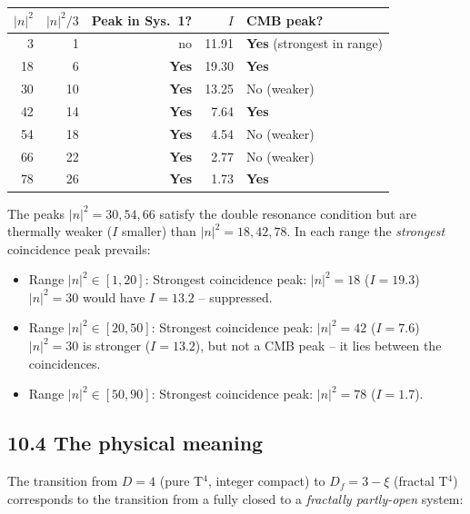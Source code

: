 \begin{center}
\begin{tabular}{rrrrl}
\toprule
$|n|^2$ & $|n|^2/3$ & Peak in Sys.~1? & $I$ & CMB peak? \\
\midrule
3  & 1  & no & 11{.}91 & \textbf{Yes} (strongest in range) \\
18 & 6  & \textbf{Yes} & 19{.}30 & \textbf{Yes} \\
30 & 10 & \textbf{Yes} & 13{.}25 & No (weaker) \\
42 & 14 & \textbf{Yes} & 7{.}64  & \textbf{Yes} \\
54 & 18 & \textbf{Yes} & 4{.}54  & No (weaker) \\
66 & 22 & \textbf{Yes} & 2{.}77  & No (weaker) \\
78 & 26 & \textbf{Yes} & 1{.}73  & \textbf{Yes} \\
\bottomrule
\end{tabular}
\end{center}

The peaks $|n|^2 = 30, 54, 66$ satisfy the double resonance condition
but are thermally weaker ($I$ smaller) than $|n|^2 = 18, 42, 78$.
In each range the \emph{strongest} coincidence peak prevails:

\begin{itemize}
  \item Range $|n|^2 \in [1, 20]$:\quad
        Strongest coincidence peak: $|n|^2 = 18$ ($I = 19{.}3$) \\
        \hphantom{Range $|n|^2 \in [1, 20]$:\quad}
        $|n|^2 = 30$ would have $I = 13{.}2$ -- suppressed.
  \item Range $|n|^2 \in [20, 50]$:\quad
        Strongest coincidence peak: $|n|^2 = 42$ ($I = 7{.}6$) \\
        \hphantom{Range $|n|^2 \in [20, 50]$:\quad}
        $|n|^2 = 30$ is stronger ($I = 13{.}2$), but not a CMB peak --
        it lies between the coincidences.
  \item Range $|n|^2 \in [50, 90]$:\quad
        Strongest coincidence peak: $|n|^2 = 78$ ($I = 1{.}7$).
\end{itemize}

\subsection*{10.4 The physical meaning}

The transition from $D = 4$ (pure T$^4$, integer compact) to
$D_f = 3 - \xi$ (fractal T$^4$) corresponds to the transition from a
fully closed to a \emph{fractally partly-open} system:

